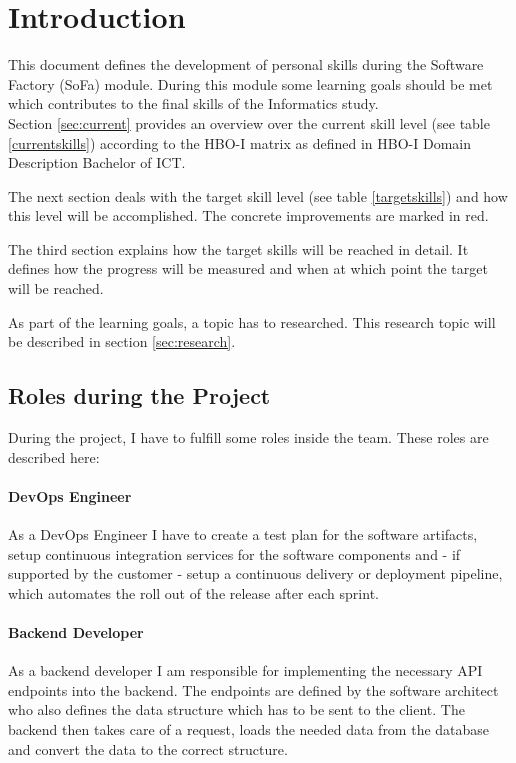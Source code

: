 \section{Introduction}
\label{sec:intro}

This document defines the development of personal skills during the Software Factory (SoFa) module.
During this module some learning goals should be met which contributes to the final skills of the Informatics study.
~\\
Section \ref{sec:current} provides an overview over the current skill level (see table \ref{currentskills}) according to the HBO-I matrix as defined in \glqq HBO-I Domain Description Bachelor of ICT\grqq.

The next section deals with the target skill level (see table \ref{targetskills}) and how this level will be accomplished. The concrete improvements are marked in red.

The third section explains how the target skills will be reached in detail. It defines how the progress will be measured and when at which point the target will be reached.

As part of the learning goals, a topic has to researched. This research topic will be described in section \ref{sec:research}.

\subsection{Roles during the Project}

During the project, I have to fulfill some roles inside the team. These roles are described here:

\paragraph{DevOps Engineer} As a DevOps Engineer I have to create a test plan for the software artifacts, setup continuous integration services for the software components and - if supported by the customer - setup a continuous delivery or deployment pipeline, which automates the roll out of the release after each sprint.

\paragraph{Backend Developer} As a backend developer I am responsible for implementing the necessary API endpoints into the backend. The endpoints are defined by the software architect who also defines the data structure which has to be sent to the client. The backend then takes care of a request, loads the needed data from the database and convert the data to the correct structure.

